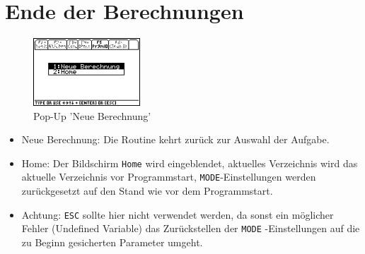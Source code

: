 \documentclass[
	a4paper							%
	,12pt							%
	,twoside						%
	,openright						%
]{scrreprt}							%
\begin{document}
\section{Ende der Berechnungen}
\begin{figure}[h]
  \centering
  \includegraphics[width=4cm]{img/nummeth_image048.png}
  \caption{Pop-Up 'Neue Berechnung’}
  \label{fig:NeueBerechnung}
\end{figure}
\begin{itemize}
  \item Neue Berechnung: Die Routine kehrt zur\"uck zur Auswahl der Aufgabe.
  \item Home: Der Bildschirm \verb|Home| wird eingeblendet, aktuelles Verzeichnis wird das aktuelle Verzeichnis vor Programmstart, \verb|MODE|-Einstellungen werden zur\"uckgesetzt auf den Stand wie vor dem Programmstart.
  \item Achtung: \verb|ESC| sollte hier nicht verwendet werden, da sonst ein m\"oglicher Fehler (Undefined Variable) das Zur\"uckstellen der \verb|MODE| -Einstellungen auf die zu Beginn gesicherten Parameter umgeht.
\end{itemize}
\end{document}
